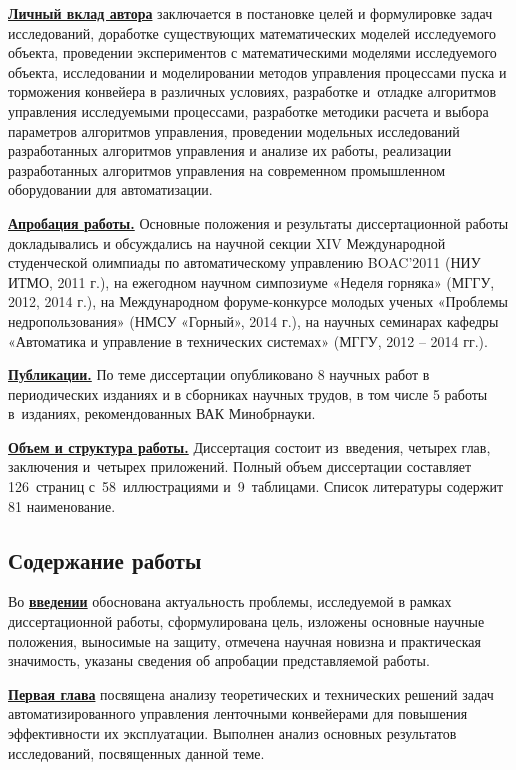 \underline{\textbf{Личный вклад автора}} заключается в постановке целей и формулировке задач исследований, доработке существующих математических моделей исследуемого объекта, проведении экспериментов с математическими моделями исследуемого объекта, исследовании и моделировании методов управления процессами пуска и торможения конвейера в различных условиях, разработке и~отладке алгоритмов управления исследуемыми процессами, разработке методики расчета и выбора параметров алгоритмов управления, проведении модельных исследований разработанных алгоритмов управления и анализе их работы, реализации разработанных алгоритмов управления на современном промышленном оборудовании для автоматизации.
\bigskip

\underline{\textbf{Апробация работы.}} Основные положения и результаты диссертационной работы докладывались и обсуждались на научной секции XIV Международной студенческой олимпиады по автоматическому управлению BOAC’2011 (НИУ ИТМО, 2011 г.), на ежегодном научном симпозиуме «Неделя горняка» (МГГУ, 2012, 2014 г.), на Международном форуме-конкурсе молодых ученых «Проблемы недропользования» (НМСУ «Горный», 2014 г.), на научных семинарах кафедры «Автоматика и управление в технических системах» (МГГУ, 2012 -- 2014 гг.).
\bigskip

\underline{\textbf{Публикации.}} По теме диссертации опубликовано 8 научных работ в периодических изданиях и в сборниках научных трудов, в том числе 5 работы в~изданиях, рекомендованных ВАК Минобрнауки.
\bigskip

\underline{\textbf{Объем и структура работы.}} Диссертация состоит из~введения, четырех глав, заключения и~четырех приложений. Полный объем диссертации составляет 126~страниц с~58~иллюстрациями и~9~таблицами. Список литературы содержит 81 наименование.

\subsection*{\Large Содержание работы}

Во \underline{\textbf{введении}} обоснована актуальность проблемы, исследуемой в рамках диссертационной работы, сформулирована цель, изложены основные научные положения, выносимые на защиту, отмечена научная новизна и практическая значимость, указаны сведения об апробации представляемой работы.
\bigskip

\underline{\textbf{Первая глава}} посвящена анализу теоретических и технических решений задач автоматизированного управления ленточными конвейерами для повышения эффективности их эксплуатации. Выполнен анализ основных результатов исследований, посвященных данной теме.

